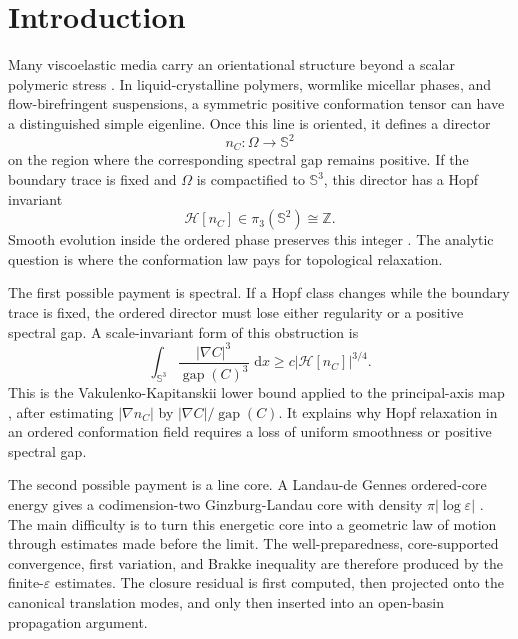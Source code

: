 \documentclass[11pt]{article}
\theoremstyle{definition}
\newcommand{\Sph}{\mathbb S}
\newcommand{\dd}{\,\mathrm d}
\newcommand{\eps}{\varepsilon}
\newcommand{\Hopf}{\mathcal H}
\newcommand{\gap}{\operatorname{gap}}
\begin{document}
\section{Introduction}

Many viscoelastic media carry an orientational structure beyond a scalar
polymeric stress \cite{Oldroyd,DoiEdwards,BerisEdwards,DeGennesProst,LionsMasmoudi,BarrettSuli,ConstantinKliegl}.  In
liquid-crystalline polymers, wormlike micellar phases, and flow-birefringent
suspensions, a symmetric positive conformation tensor can have a distinguished
simple eigenline.  Once this line is oriented, it defines
a director
\[
        n_C:\Omega\longrightarrow \Sph^2
\]
on the region where the corresponding spectral gap remains positive.  If the
boundary trace is fixed and \(\Omega\) is compactified to \(\Sph^3\), this
director has a Hopf invariant
\[
        \Hopf[n_C]\in\pi_3(\Sph^2)\cong\mathbb Z .
\]
Smooth evolution inside the ordered phase preserves this integer
\cite{Moffatt,ArnoldKhesin,WhiteSobolevHomotopy,HardtLin,BrezisCoronLieb}.  The analytic question is where the conformation law pays for topological relaxation.

The first possible payment is spectral.  If a Hopf class changes while the
boundary trace is fixed, the ordered director must lose either regularity or a
positive spectral gap.  A scale-invariant form of this obstruction is
\[
        \int_{\Sph^3}\frac{|\nabla C|^3}{\gap(C)^3}\,\dd x
        \ge c|\Hopf[n_C]|^{3/4}.
\]
This is the Vakulenko-Kapitanskii lower bound applied to the principal-axis map
\cite{VakulenkoKapitanskii}, after estimating \(|\nabla n_C|\) by
\(|\nabla C|/\gap(C)\).  It explains why Hopf relaxation in an ordered
conformation field requires a loss of uniform smoothness or positive spectral gap.

The second possible payment is a line core.  A Landau-de Gennes ordered-core
energy gives a codimension-two Ginzburg-Landau core with density
\(\pi|\log\eps|\) \cite{BethuelBrezisHelein,JerrardSoner,SandierSerfaty,BethuelOrlandiSmetsConcentration,BethuelOrlandiSmetsMeanCurvature,JerrardSmets}.  The
main difficulty is to turn this energetic core into a geometric law of motion
through estimates made before the limit.  The well-preparedness,
core-supported convergence, first variation, and Brakke inequality
\cite{Allard,Brakke,Ilmanen,AmbrosioSoner} are therefore produced by the finite-\(\eps\) estimates.  The
closure residual is first computed, then projected onto the canonical
translation modes, and only then inserted into an open-basin propagation
argument.
\end{document}
